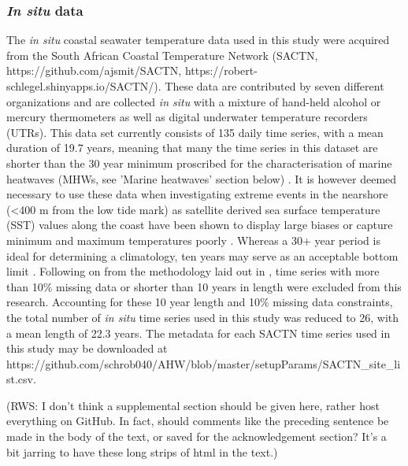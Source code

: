 \documentclass[a4paper,10pt,review]{elsarticle}
\begin{document}
\subsubsection{\emph{In situ} data}
The \emph{in situ} coastal seawater temperature data used in this study were acquired from the South African Coastal Temperature Network (SACTN, https://github.com/ajsmit/SACTN, https://robert-schlegel.shinyapps.io/SACTN/). These data are contributed by seven different organizations and are collected \emph{in situ} with a mixture of hand-held alcohol or mercury thermometers as well as digital underwater temperature recorders (UTRs). This data set currently consists of 135 daily time series, with a mean duration of 19.7 years, meaning that many the time series in this dataset are shorter than the 30 year minimum proscribed for the characterisation of marine heatwaves (MHWs, see 'Marine heatwaves' section below) \citep{Hobday2016}. It is however deemed necessary to use these data when investigating extreme events in the nearshore (<400 m from the low tide mark) as satellite derived sea surface temperature (SST) values along the coast have been shown to display large biases \citep{Smit2013} or capture minimum and maximum temperatures poorly \citep{Smale2009, Castillo2010}. Whereas a 30+ year period is ideal for determining a climatology, ten years may serve as an acceptable bottom limit \citep{Schlegel2017}. Following on from the methodology laid out in \citet{Schlegel2017}, time series with more than 10\% missing data or shorter than 10 years in length were excluded from this research. Accounting for these 10 year length and 10\% missing data constraints, the total number of \emph{in situ} time series used in this study was reduced to 26, with a mean length of 22.3 years. The metadata for each SACTN time series used in this study may be downloaded at https://github.com/schrob040/AHW/blob/master/setupParams/SACTN\_site\_list.csv.

(RWS: I don't think a supplemental section should be given here, rather host everything on GitHub. In fact, should comments like the preceding sentence be made in the body of the text, or saved for the acknowledgement section? It's a bit jarring to have these long strips of html in the text.)
\end{document}
